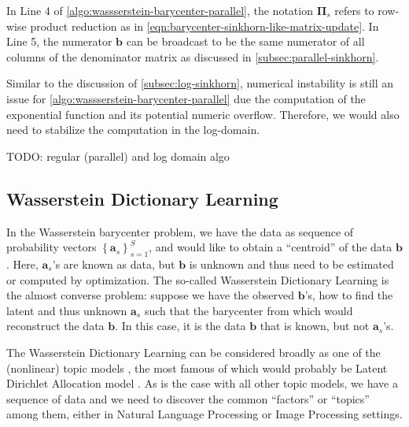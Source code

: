 \begin{remark}[]
  In Line 4 of \cref{algo:wassserstein-barycenter-parallel},
  the notation $\boldsymbol\Pi_s$ refers to row-wise product reduction
  as in \cref{eqn:barycenter-sinkhorn-like-matrix-update}.
  In Line 5, the numerator $\mathbf{b}$ can be broadcast to be the same numerator of all columns of the denominator matrix
  as discussed in \cref{subsec:parallel-sinkhorn}.
\end{remark}

Similar to the discussion of \cref{subsec:log-sinkhorn},
numerical instability is still an issue for \cref{algo:wassserstein-barycenter-parallel}
due the computation of the exponential function and its potential numeric overflow.
Therefore, we would also need to stabilize the computation in the log-domain.

TODO: {\color{red}
regular (parallel) and log domain algo
}

























\subsection{Wasserstein Dictionary Learning}\label{subsec:wasserstein-dictionary-learning}

In the Wasserstein barycenter problem, we have the data as sequence of probability vectors
$\left\{\mathbf{a}_s\right\}_{s = 1}^S$,
and would like to obtain a ``centroid'' of the data $\mathbf{b}$.
Here, $\mathbf{a}_s$'s are known as data, but $\mathbf{b}$ is unknown and thus need to be estimated or computed by optimization.
The so-called Wasserstein Dictionary Learning \citep{schmitz2018} is the almost converse problem:
suppose we have the observed $\mathbf{b}$'s, how to find the latent and thus unknown $\mathbf{a}_s$ such that the barycenter from which would reconstruct the data $\mathbf{b}$.
In this case, it is the data $\mathbf{b}$ that is known, but not $\mathbf{a}_s$'s.

The Wasserstein Dictionary Learning can be considered broadly as one of the (nonlinear) topic models \citep{blei2009},
the most famous of which would probably be Latent Dirichlet Allocation model \citep{blei2003}.
As is the case with all other topic models,
we have a sequence of data and we need to discover the common ``factors'' or ``topics'' among them,
either in Natural Language Processing \citep{xu2018} or Image Processing \citep{schmitz2018} settings.


